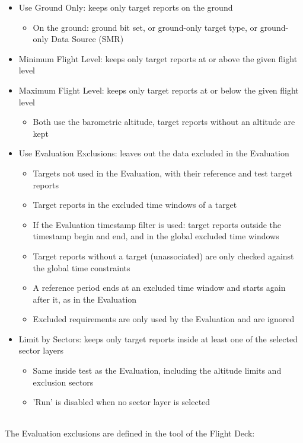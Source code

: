 \begin{itemize}
\item Use Ground Only: keeps only target reports on the ground
\begin{itemize}
\item On the ground: ground bit set, or ground-only target type, or ground-only Data Source (SMR)
\end{itemize}
\item Minimum Flight Level: keeps only target reports at or above the given flight level
\item Maximum Flight Level: keeps only target reports at or below the given flight level
\begin{itemize}
\item Both use the barometric altitude, target reports without an altitude are kept
\end{itemize}
\item Use Evaluation Exclusions: leaves out the data excluded in the Evaluation
\begin{itemize}
\item Targets not used in the Evaluation, with their reference and test target reports
\item Target reports in the excluded time windows of a target
\item If the Evaluation timestamp filter is used: target reports outside the timestamp begin and end, and in the global excluded time windows
\item Target reports without a target (unassociated) are only checked against the global time constraints
\item A reference period ends at an excluded time window and starts again after it, as in the Evaluation
\item Excluded requirements are only used by the Evaluation and are ignored
\end{itemize}
\item Limit by Sectors: keeps only target reports inside at least one of the selected sector layers
\begin{itemize}
\item Same inside test as the Evaluation, including the altitude limits and exclusion sectors
\item 'Run' is disabled when no sector layer is selected
\end{itemize}
\end{itemize}
\ \\

The Evaluation exclusions are defined in the  tool of the Flight Deck:

